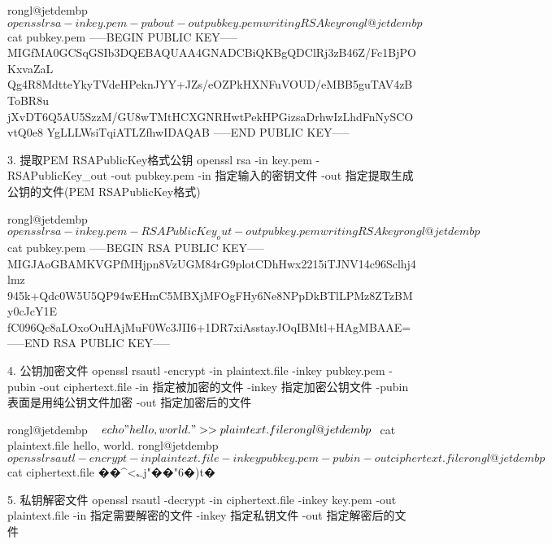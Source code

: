     rongl@jetdembp ~ $ openssl rsa -in key.pem -pubout -out pubkey.pem
    writing RSA key
    rongl@jetdembp ~ $ cat pubkey.pem
    -----BEGIN PUBLIC KEY-----
    MIGfMA0GCSqGSIb3DQEBAQUAA4GNADCBiQKBgQDClRj3zB46Z/Fc1BjPOKxvaZaL
    Qg4R8MdtteYkyTVdeHPeknJYY+JZs/eOZPkHXNFuVOUD/eMBB5guTAV4zBToBR8u
    jXvDT6Q5AU5SzzM/GU8wTMtHCXGNRHwtPekHPGizsaDrhwIzLhdFnNySCOvtQ0e8
    YgLLLWsiTqiATLZfhwIDAQAB
    -----END PUBLIC KEY-----


3. 提取PEM RSAPublicKey格式公钥
openssl rsa -in key.pem -RSAPublicKey_out -out pubkey.pem
    -in 指定输入的密钥文件
    -out 指定提取生成公钥的文件(PEM RSAPublicKey格式)

    rongl@jetdembp ~ $ openssl rsa -in key.pem -RSAPublicKey_out -out pubkey.pem
    writing RSA key
    rongl@jetdembp ~ $ cat pubkey.pem
    -----BEGIN RSA PUBLIC KEY-----
    MIGJAoGBAMKVGPfMHjpn8VzUGM84rG9plotCDhHwx2215iTJNV14c96Sclhj4lmz
    945k+Qdc0W5U5QP94wEHmC5MBXjMFOgFHy6Ne8NPpDkBTlLPMz8ZTzBMy0cJcY1E
    fC096Qc8aLOxoOuHAjMuF0Wc3JII6+1DR7xiAsstayJOqIBMtl+HAgMBAAE=
    -----END RSA PUBLIC KEY-----


4. 公钥加密文件
openssl rsautl -encrypt -in plaintext.file -inkey pubkey.pem -pubin -out ciphertext.file
    -in 指定被加密的文件
    -inkey 指定加密公钥文件
    -pubin 表面是用纯公钥文件加密
    -out 指定加密后的文件

    rongl@jetdembp ~ $ echo "hello, world." >> plaintext.file
    rongl@jetdembp ~ $ cat plaintext.file
    hello, world.
    rongl@jetdembp ~ $ openssl rsautl -encrypt -in plaintext.file -inkey pubkey.pem -pubin -out ciphertext.file
    rongl@jetdembp ~ $ cat ciphertext.file
    ��^<؎j"��"6�)t�%


5. 私钥解密文件
openssl rsautl -decrypt -in ciphertext.file -inkey key.pem -out plaintext.file
    -in 指定需要解密的文件
    -inkey 指定私钥文件
    -out 指定解密后的文件

